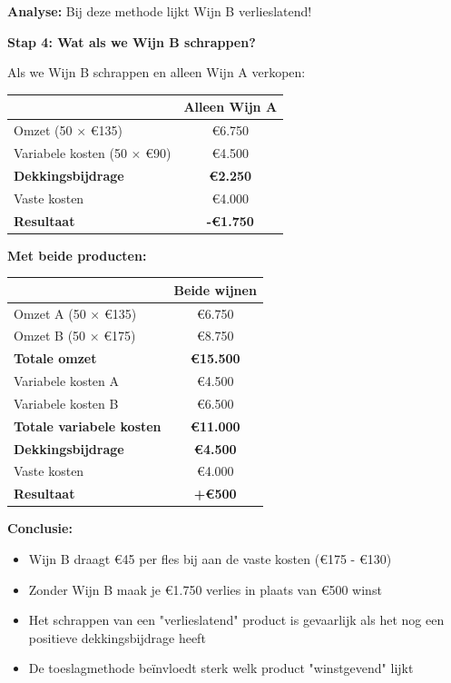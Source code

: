 \documentclass[a4paper,11pt]{article}
\begin{document}
\begin{description}
\begin{oefenblok}[title=Oefening: Wijnhandelaar - Toeslagen en Productmix]
        \textbf{Analyse:} Bij deze methode lijkt Wijn B verlieslatend!
        
        \textbf{Stap 4: Wat als we Wijn B schrappen?}
        
        Als we Wijn B schrappen en alleen Wijn A verkopen:
        
        \begin{tabular}{lc}
        \hline
        & \textbf{Alleen Wijn A} \\
        \hline
        Omzet (50 × €135) & €6.750 \\
        Variabele kosten (50 × €90) & €4.500 \\
        \textbf{Dekkingsbijdrage} & \textbf{€2.250} \\
        Vaste kosten & €4.000 \\
        \textbf{Resultaat} & \textbf{-€1.750} \\
        \hline
        \end{tabular}
        
        \textbf{Met beide producten:}
        
        \begin{tabular}{lc}
        \hline
        & \textbf{Beide wijnen} \\
        \hline
        Omzet A (50 × €135) & €6.750 \\
        Omzet B (50 × €175) & €8.750 \\
        \textbf{Totale omzet} & \textbf{€15.500} \\
        Variabele kosten A & €4.500 \\
        Variabele kosten B & €6.500 \\
        \textbf{Totale variabele kosten} & \textbf{€11.000} \\
        \textbf{Dekkingsbijdrage} & \textbf{€4.500} \\
        Vaste kosten & €4.000 \\
        \textbf{Resultaat} & \textbf{+€500} \\
        \hline
        \end{tabular}
        
        \textbf{Conclusie:}
        \begin{itemize}
            \item Wijn B draagt €45 per fles bij aan de vaste kosten (€175 - €130)
            \item Zonder Wijn B maak je €1.750 verlies in plaats van €500 winst
            \item Het schrappen van een "verlieslatend" product is gevaarlijk als het nog een positieve dekkingsbijdrage heeft
            \item De toeslagmethode beïnvloedt sterk welk product "winstgevend" lijkt
        \end{itemize}
    \end{oefenblok}



\end{description}
\end{document}
